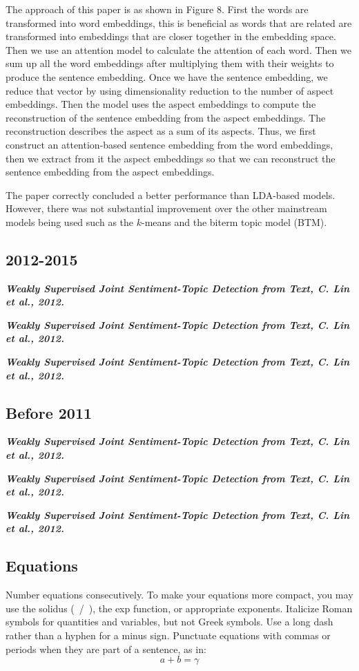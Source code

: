 \documentclass[conference]{IEEEtran}
\begin{document}
The approach of this paper is as shown in Figure 8. First the words are transformed into word embeddings, this is beneficial as words that are related are transformed into embeddings that are closer together in the embedding space. Then we use an attention model to calculate the attention of each word. Then we sum up all the word embeddings after multiplying them with their weights to produce the sentence embedding. Once we have the sentence embedding, we reduce that vector by using dimensionality reduction to the number of aspect embeddings. Then the model uses the aspect embeddings to compute the reconstruction of the sentence embedding from the aspect embeddings. The reconstruction describes the aspect as a sum of its aspects. Thus, we first construct an attention-based sentence embedding from the word embeddings, then we extract from it the aspect embeddings so that we can reconstruct the sentence embedding from the aspect embeddings.

The paper correctly concluded a better performance than LDA-based models. However, there was not substantial improvement over the other mainstream models being used such as the $k$-means and the biterm topic model (BTM).

\subsection{2012-2015}

\textit{\textbf{Weakly Supervised Joint Sentiment-Topic Detection from Text, C. Lin et al., 2012.}}



\textit{\textbf{Weakly Supervised Joint Sentiment-Topic Detection from Text, C. Lin et al., 2012.}}

\textit{\textbf{Weakly Supervised Joint Sentiment-Topic Detection from Text, C. Lin et al., 2012.}}

\subsection{Before 2011}

\textit{\textbf{Weakly Supervised Joint Sentiment-Topic Detection from Text, C. Lin et al., 2012.}}

\textit{\textbf{Weakly Supervised Joint Sentiment-Topic Detection from Text, C. Lin et al., 2012.}}

\textit{\textbf{Weakly Supervised Joint Sentiment-Topic Detection from Text, C. Lin et al., 2012.}}

\subsection{Equations}
Number equations consecutively. To make your 
equations more compact, you may use the solidus (~/~), the exp function, or 
appropriate exponents. Italicize Roman symbols for quantities and variables, 
but not Greek symbols. Use a long dash rather than a hyphen for a minus 
sign. Punctuate equations with commas or periods when they are part of a 
sentence, as in:
\begin{equation}
a+b=\gamma\label{eq}
\end{equation}
\end{document}
